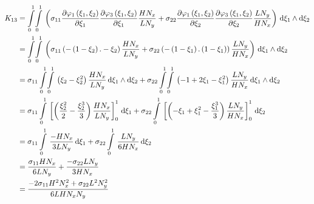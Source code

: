 \begin{equation}
  \begin{aligned}
    K_{13}&=\giint{0}{1}{0}{1}{\pbrac{\sigma_{11}\delby{\lbfn{1}{\xi_{1},\xi_{2}}}{\xi_{1}}\delby{\lbfn{3}{\xi_{1},\xi_{2}}}{\xi_{1}}
        \dfrac{H N_{x}}{L N_{y}}+\sigma_{22}\delby{\lbfn{1}{\xi_{1},\xi_{2}}}{\xi_{2}}\delby{\lbfn{3}{\xi_{1},\xi_{2}}}{\xi_{2}}
        \dfrac{L N_{y}}{H N_{x}}}}{\xi_{1}}{\xi_{2}}\\
    &=\giint{0}{1}{0}{1}{\pbrac{\sigma_{11}\pbrac{-\pbrac{1-\xi_{2}}.-\xi_{2}}\dfrac{H N_{x}}{L N_{y}}+
    \sigma_{22}\pbrac{-\pbrac{1-\xi_{1}}.\pbrac{1-\xi_{1}}}\dfrac{L N_{y}}{H N_{x}}}}{\xi_{1}}{\xi_{2}} \\
    &=\sigma_{11}\giint{0}{1}{0}{1}{\pbrac{\xi_{2}-\xi_{2}^{2}}\dfrac{H N_{x}}{L N_{y}}}{\xi_{1}}{\xi_{2}}+
    \sigma_{22}\giint{0}{1}{0}{1}{\pbrac{-1+2\xi_{1}-\xi_{1}^{2}}\dfrac{L N_{y}}{H N_{x}}}{\xi_{1}}{\xi_{2}} \\
    &=\sigma_{11}\gint{0}{1}{\sqbrac{\pbrac{\dfrac{\xi_{2}^{2}}{2}-\dfrac{\xi_{2}^{3}}{3}}\dfrac{H N_{x}}{L N_{y}}}_{0}^{1}}{\xi_{1}}+
    \sigma_{22}\gint{0}{1}{\sqbrac{\pbrac{-\xi_{1}+\xi_{1}^{2}-\dfrac{\xi_{1}^{3}}{3}}\dfrac{L N_{y}}{H N_{x}}}_{0}^{1}}{\xi_{2}} \\
    &=\sigma_{11}\gint{0}{1}{\dfrac{-H N_{x}}{3 L N_{y}}}{\xi_{1}}+\sigma_{22}\gint{0}{1}{\dfrac{L N_{y}}{6 H N_{x}}}{\xi_{2}} \\
    &=\dfrac{\sigma_{11} H N_{x}}{6 L N_{y}}+\dfrac{-\sigma_{22} L N_{y}}{3 H N_{x}} \\
    &=\dfrac{-2\sigma_{11} H^{2}N_{x}^{2}+\sigma_{22}L^{2}N_{y}^{2}}{6 L H N_{x} N_{y}}
  \end{aligned}
\end{equation}

